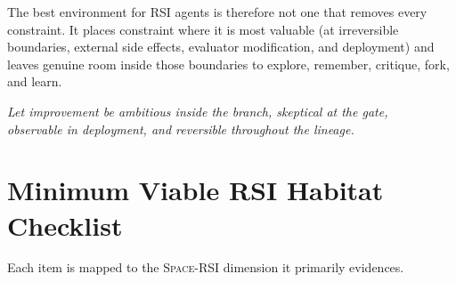 \documentclass[11pt,a4paper]{article}
\newcommand{\spacersi}{\textsc{Space-RSI}}
\begin{document}
The best environment for RSI agents is therefore not one that removes every constraint. It places constraint where it is most valuable (at irreversible boundaries, external side effects, evaluator modification, and deployment) and leaves genuine room inside those boundaries to explore, remember, critique, fork, and learn.

\begin{center}
\emph{Let improvement be ambitious inside the branch, skeptical at the gate,\\ observable in deployment, and reversible throughout the lineage.}
\end{center}

\appendix
\section{Minimum Viable RSI Habitat Checklist}\label{app:checklist}
Each item is mapped to the \spacersi{} dimension it primarily evidences.
\end{document}
